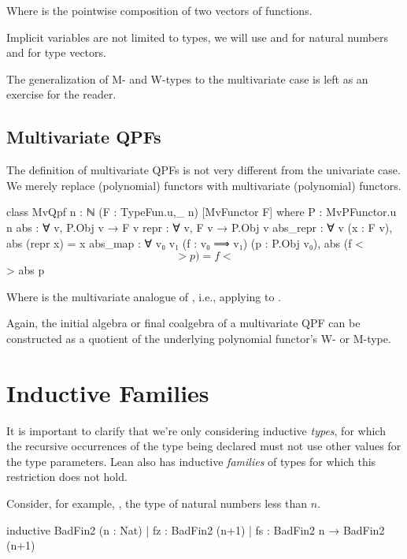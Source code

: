 Where  is the pointwise composition of two vectors of functions.

\begin{remark}
    Implicit variables are not limited to types, we will use  and  for natural numbers and  for type vectors.
\end{remark}

The generalization of M- and W-types to the multivariate case is left as an exercise for the reader.

\subsection*{Multivariate QPFs}
The definition of multivariate QPFs is not very different from the univariate case. We merely replace (polynomial) functors with multivariate (polynomial) functors.

\begin{leancode}
  class MvQpf {n : ℕ} (F : TypeFun.{u,_} n) [MvFunctor F]  where
    P         : MvPFunctor.{u} n
    abs       : ∀ {v}, P.Obj v → F v
    repr      : ∀ {v}, F v → P.Obj v
    abs_repr  : ∀ {v} (x : F v), abs (repr x) = x
    abs_map   : ∀ {v₀ v₁} (f : v₀ ⟹ v₁) (p : P.Obj v₀), 
                    abs (f <$$> p) = f <$$> abs p
\end{leancode}

Where  is the multivariate analogue of , i.e., applying 
 to .

Again, the initial algebra or final coalgebra of a multivariate QPF
can be constructed as a quotient of the underlying polynomial functor's W- or M-type.


\section{Inductive Families}%
\label{sec:ind_families}

It is important to clarify that we're only considering inductive \emph{types}, 
for which the recursive occurrences of the type being declared must not use other values for the type parameters. Lean also has inductive \emph{families} of types for which this restriction does not hold.

Consider, for example, , the type of natural numbers less than $n$.
\begin{badleancode}
    inductive BadFin2 (n : Nat)
    | fz : BadFin2 (n+1)
    | fs : BadFin2 n → BadFin2 (n+1)
\end{badleancode}

